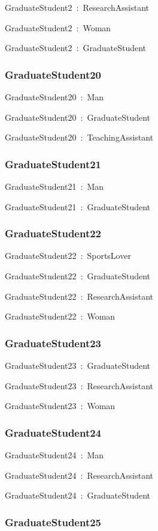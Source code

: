 \documentclass{article}
\begin{document}
GraduateStudent2~:~ResearchAssistant

GraduateStudent2~:~Woman

GraduateStudent2~:~GraduateStudent

\subsubsection*{GraduateStudent20}

GraduateStudent20~:~Man

GraduateStudent20~:~GraduateStudent

GraduateStudent20~:~TeachingAssistant

\subsubsection*{GraduateStudent21}

GraduateStudent21~:~Man

GraduateStudent21~:~GraduateStudent

\subsubsection*{GraduateStudent22}

GraduateStudent22~:~SportsLover

GraduateStudent22~:~GraduateStudent

GraduateStudent22~:~ResearchAssistant

GraduateStudent22~:~Woman

\subsubsection*{GraduateStudent23}

GraduateStudent23~:~GraduateStudent

GraduateStudent23~:~ResearchAssistant

GraduateStudent23~:~Woman

\subsubsection*{GraduateStudent24}

GraduateStudent24~:~Man

GraduateStudent24~:~ResearchAssistant

GraduateStudent24~:~GraduateStudent

\subsubsection*{GraduateStudent25}
\end{document}
